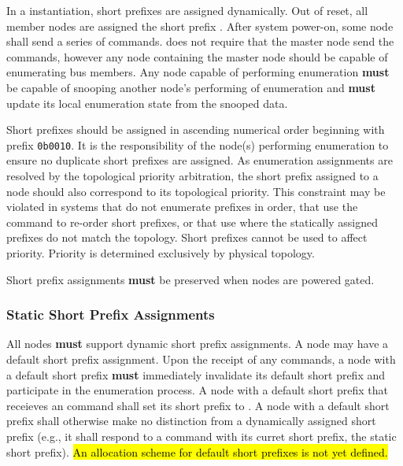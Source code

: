 In a \bus instantiation, short prefixes are assigned dynamically. Out of
reset, all member nodes are assigned the short prefix
. After system power-on, some node
shall send a series of  commands. \bus does not
require that the master node send the  commands,
however any node containing the master node should be capable of enumerating
bus members. Any node capable of performing enumeration {\bf must} be capable
of snooping another node's performing of enumeration and {\bf must} update its
local enumeration state from the snooped data.

Short prefixes should be assigned in ascending numerical order beginning with
prefix {\tt 0b0010}.
It is the responsibility of the
node(s) performing enumeration to ensure no duplicate short prefixes are
assigned.
As enumeration assignments are resolved by the
topological priority arbitration, the short prefix assigned to a node should
also correspond to its topological priority.
This constraint may be violated in systems that do not enumerate prefixes in
order, that use the
 command to re-order short prefixes, or
that use  where the statically
assigned prefixes do not match the topology. Short prefixes cannot be used to
affect priority. Priority is determined exclusively by physical topology.

Short prefix assignments {\bf must} be preserved when nodes are powered gated.

\subsubsection{Static Short Prefix Assignments}
\label{sec:addressing-static-short-prefix}
All \bus nodes {\bf must} support dynamic short prefix assignments. A node may
have a default short prefix assignment. Upon the receipt of any
 commands, a node with a default short prefix {\bf
must} immediately invalidate its default short prefix and participate in the
enumeration process. A node with a default short prefix that receieves an
 command shall set its short prefix to
. A node with a default short prefix
shall otherwise make no distinction from a dynamically assigned short prefix
(e.g., it shall respond to a  command with its
curret short prefix, the static short prefix).
\hl{An allocation scheme for default short prefixes is not yet defined.}


